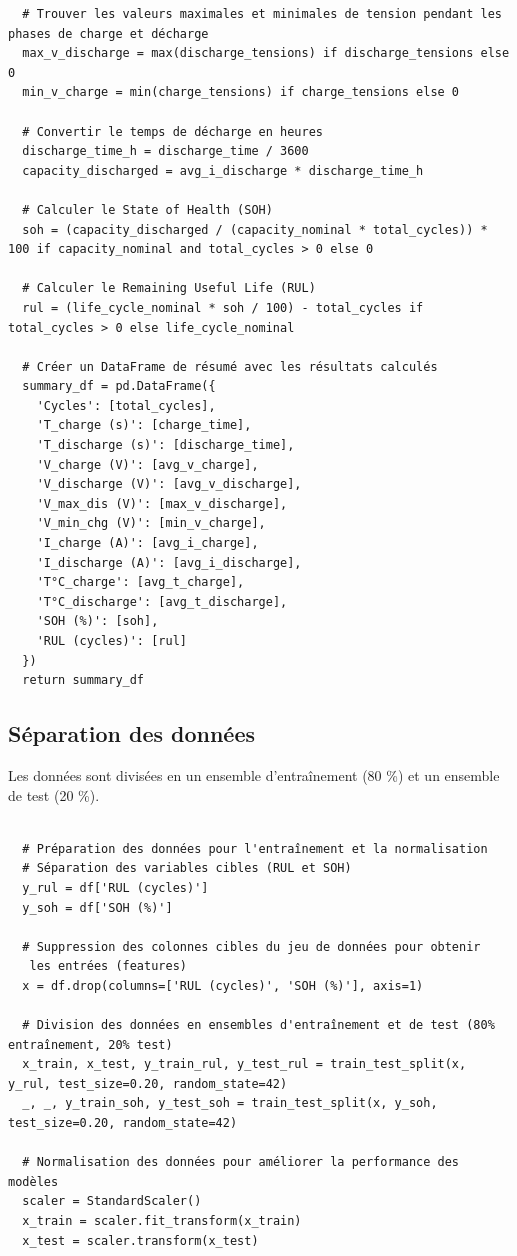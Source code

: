 \begin{verbatim}
  # Trouver les valeurs maximales et minimales de tension pendant les phases de charge et décharge
  max_v_discharge = max(discharge_tensions) if discharge_tensions else 0
  min_v_charge = min(charge_tensions) if charge_tensions else 0
  	
  # Convertir le temps de décharge en heures
  discharge_time_h = discharge_time / 3600
  capacity_discharged = avg_i_discharge * discharge_time_h
  
  # Calculer le State of Health (SOH)
  soh = (capacity_discharged / (capacity_nominal * total_cycles)) * 100 if capacity_nominal and total_cycles > 0 else 0
  
  # Calculer le Remaining Useful Life (RUL)
  rul = (life_cycle_nominal * soh / 100) - total_cycles if total_cycles > 0 else life_cycle_nominal
  
  # Créer un DataFrame de résumé avec les résultats calculés
  summary_df = pd.DataFrame({
  	'Cycles': [total_cycles],
  	'T_charge (s)': [charge_time],
  	'T_discharge (s)': [discharge_time],
  	'V_charge (V)': [avg_v_charge],
  	'V_discharge (V)': [avg_v_discharge],
  	'V_max_dis (V)': [max_v_discharge],
  	'V_min_chg (V)': [min_v_charge],
  	'I_charge (A)': [avg_i_charge],
  	'I_discharge (A)': [avg_i_discharge],
  	'T°C_charge': [avg_t_charge],
  	'T°C_discharge': [avg_t_discharge],
  	'SOH (%)': [soh],
  	'RUL (cycles)': [rul]
  })
  return summary_df
\end{verbatim}


\subsection{Séparation des données}
Les données sont divisées en un ensemble d'entraînement (80 \%) et un ensemble de test (20 \%).
\begin{verbatim}

  # Préparation des données pour l'entraînement et la normalisation
  # Séparation des variables cibles (RUL et SOH)
  y_rul = df['RUL (cycles)']
  y_soh = df['SOH (%)']
  
  # Suppression des colonnes cibles du jeu de données pour obtenir
   les entrées (features)
  x = df.drop(columns=['RUL (cycles)', 'SOH (%)'], axis=1)
  
  # Division des données en ensembles d'entraînement et de test (80% entraînement, 20% test)
  x_train, x_test, y_train_rul, y_test_rul = train_test_split(x, y_rul, test_size=0.20, random_state=42)
  _, _, y_train_soh, y_test_soh = train_test_split(x, y_soh, test_size=0.20, random_state=42)
  
  # Normalisation des données pour améliorer la performance des modèles
  scaler = StandardScaler()
  x_train = scaler.fit_transform(x_train)
  x_test = scaler.transform(x_test)
\end{verbatim}



